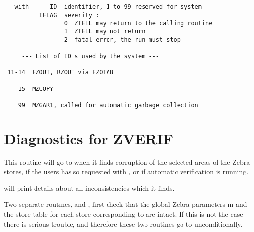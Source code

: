 \label{sec:diaztell}

\begin{verbatim}
   with      ID  identifier, 1 to 99 reserved for system
          IFLAG  severity :
                 0  ZTELL may return to the calling routine
                 1  ZTELL may not return
                 2  fatal error, the run must stop

     --- List of ID's used by the system ---

 11-14  FZOUT, RZOUT via FZOTAB

    15  MZCOPY

    99  MZGAR1, called for automatic garbage collection
\end{verbatim}

\section{Diagnostics for ZVERIF}


This routine will go to  when it finds corruption of
the selected areas of the Zebra stores, if the users has
so requested with , or if automatic verification
is running.

 will print details about all inconsistencies which it finds.

Two separate routines,  
and , first check that the global
Zebra parameters in  and the store table for each store
corresponding to  are intact.
If this is not the case there is serious trouble,
and therefore these two routines go to  unconditionally.















